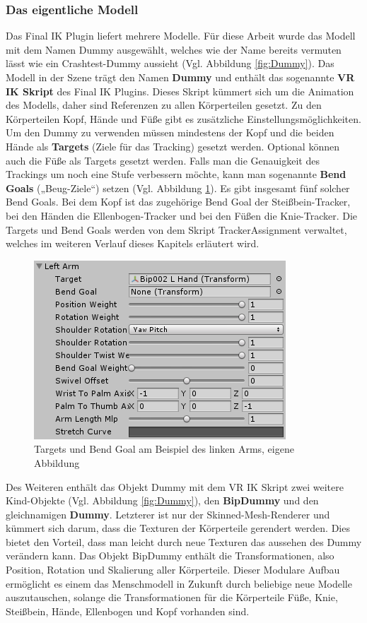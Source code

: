 \subsubsection{Das eigentliche Modell}\label{sec:MMModell}
Das Final IK Plugin liefert mehrere Modelle. Für diese Arbeit wurde das Modell mit dem Namen Dummy ausgewählt, welches wie der Name bereits vermuten lässt wie ein Crashtest-Dummy aussieht (Vgl. Abbildung \ref{fig:Dummy}).
\newline\newline
Das Modell in der Szene trägt den Namen \textbf{Dummy} und enthält das sogenannte \textbf{VR IK Skript} des Final IK Plugins. Dieses Skript kümmert sich um die Animation des Modells, daher sind Referenzen zu allen Körperteilen gesetzt. Zu den Körperteilen Kopf, Hände und Füße gibt es zusätzliche Einstellungsmöglichkeiten. Um den Dummy zu verwenden müssen mindestens der Kopf und die beiden Hände als \textbf{Targets} (Ziele für das Tracking) gesetzt werden. Optional können auch die Füße als Targets gesetzt werden. Falls man die Genauigkeit des Trackings um noch eine Stufe verbessern möchte, kann man sogenannte \textbf{Bend Goals} („Beug-Ziele“) setzen (Vgl. Abbildung \ref{fig:TargetBendGoal}). Es gibt insgesamt fünf solcher Bend Goals. Bei dem Kopf ist das zugehörige Bend Goal der Steißbein-Tracker, bei den Händen die Ellenbogen-Tracker und bei den Füßen die Knie-Tracker. Die Targets und Bend Goals werden von dem Skript TrackerAssignment verwaltet, welches im weiteren Verlauf dieses Kapitels erläutert wird.
\begin{figure}[h]
	\centering
	\includegraphics[width=0.4\linewidth]{Bilder/A36_TargetsBendGoals}
	\caption{Targets und Bend Goal am Beispiel des linken Arms, eigene Abbildung}
	\label{fig:TargetBendGoal}
\end{figure}
\newline
Des Weiteren enthält das Objekt Dummy mit dem VR IK Skript zwei weitere Kind-Objekte (Vgl. Abbildung \ref{fig:Dummy}), den \textbf{BipDummy} und den gleichnamigen \textbf{Dummy}. Letzterer ist nur der Skinned-Mesh-Renderer und kümmert sich darum, dass die Texturen der Körperteile gerendert werden. Dies bietet den Vorteil, dass man leicht durch neue Texturen das aussehen des Dummy verändern kann. Das Objekt BipDummy enthält die Transformationen, also Position, Rotation und Skalierung aller Körperteile. Dieser Modulare Aufbau ermöglicht es einem das Menschmodell in Zukunft durch beliebige neue Modelle auszutauschen, solange die Transformationen für die Körperteile Füße, Knie, Steißbein, Hände, Ellenbogen und Kopf vorhanden sind.
